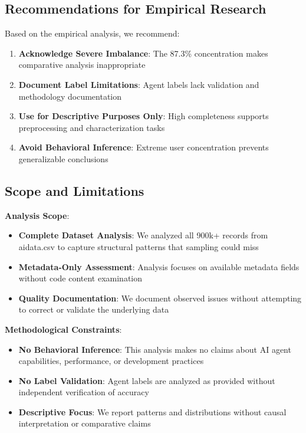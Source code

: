 \documentclass[conference]{IEEEtran}
\begin{document}
\subsection{Recommendations for Empirical Research}

Based on the empirical analysis, we recommend:

\begin{enumerate}
    \item \textbf{Acknowledge Severe Imbalance}: The 87.3\% concentration makes comparative analysis inappropriate
    \item \textbf{Document Label Limitations}: Agent labels lack validation and methodology documentation  
    \item \textbf{Use for Descriptive Purposes Only}: High completeness supports preprocessing and characterization tasks
    \item \textbf{Avoid Behavioral Inference}: Extreme user concentration prevents generalizable conclusions
\end{enumerate}

\subsection{Scope and Limitations}

\textbf{Analysis Scope}:
\begin{itemize}
    \item \textbf{Complete Dataset Analysis}: We analyzed all 900k+ records from aidata.csv to capture structural patterns that sampling could miss
    \item \textbf{Metadata-Only Assessment}: Analysis focuses on available metadata fields without code content examination
    \item \textbf{Quality Documentation}: We document observed issues without attempting to correct or validate the underlying data
\end{itemize}

\textbf{Methodological Constraints}:
\begin{itemize}
    \item \textbf{No Behavioral Inference}: This analysis makes no claims about AI agent capabilities, performance, or development practices
    \item \textbf{No Label Validation}: Agent labels are analyzed as provided without independent verification of accuracy
    \item \textbf{Descriptive Focus}: We report patterns and distributions without causal interpretation or comparative claims
\end{itemize}
\end{document}
